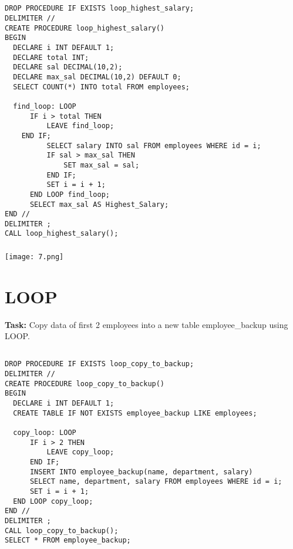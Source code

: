 \documentclass[12pt,a4paper]{article}
\begin{document}
\subsection{}
\begin{lstlisting}
DROP PROCEDURE IF EXISTS loop_highest_salary;
DELIMITER //
CREATE PROCEDURE loop_highest_salary()
BEGIN
  DECLARE i INT DEFAULT 1;
  DECLARE total INT;
  DECLARE sal DECIMAL(10,2);
  DECLARE max_sal DECIMAL(10,2) DEFAULT 0;
  SELECT COUNT(*) INTO total FROM employees;

  find_loop: LOOP
      IF i > total THEN
          LEAVE find_loop;
	END IF;
		  SELECT salary INTO sal FROM employees WHERE id = i;
		  IF sal > max_sal THEN
			  SET max_sal = sal;
		  END IF;
		  SET i = i + 1;
	  END LOOP find_loop;
	  SELECT max_sal AS Highest_Salary;
END //
DELIMITER ;
CALL loop_highest_salary();

\end{lstlisting}

\subsubsection{}
\begin{center}
    \texttt{[image: 7.png]}
\end{center}


\section{LOOP}
\textbf{Task:} Copy data of first 2 employees into a new table employee_backup using LOOP.

\subsection{}
\begin{lstlisting}
DROP PROCEDURE IF EXISTS loop_copy_to_backup;
DELIMITER //
CREATE PROCEDURE loop_copy_to_backup()
BEGIN
  DECLARE i INT DEFAULT 1;
  CREATE TABLE IF NOT EXISTS employee_backup LIKE employees;

  copy_loop: LOOP
      IF i > 2 THEN
          LEAVE copy_loop;
      END IF;
      INSERT INTO employee_backup(name, department, salary)
      SELECT name, department, salary FROM employees WHERE id = i;
      SET i = i + 1;
  END LOOP copy_loop;
END //
DELIMITER ;
CALL loop_copy_to_backup();
SELECT * FROM employee_backup;

\end{lstlisting}
\end{document}
